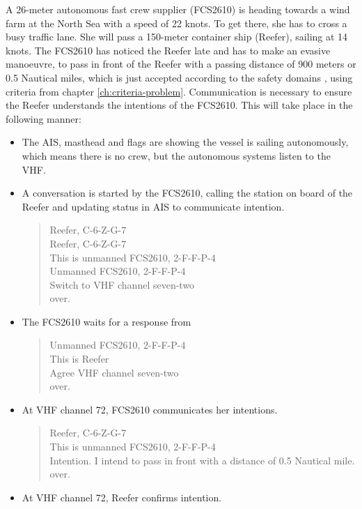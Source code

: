 A 26-meter autonomous fast crew supplier (FCS2610) is heading towards a wind farm at the North Sea with a speed of 22 knots. To get there, she has to cross a busy traffic lane. She will pass a 150-meter container ship (Reefer), sailing at 14 knots. The FCS2610 has noticed the Reefer late and has to make an evasive manoeuvre, to pass in front of the Reefer with a passing distance of 900 meters or 0.5 Nautical miles, which is just accepted according to the safety domains \cite{Szlapczynski2017a}, using criteria from chapter \ref{ch:criteria-problem}.
Communication is necessary to ensure the Reefer understands the intentions of the FCS2610. This will take place in the following manner:
\begin{itemize}
	\item The \ac{AIS}, masthead and flags are showing the vessel is sailing autonomously, which means there is no crew, but the autonomous systems listen to the \ac{VHF}.
	\item A conversation is started by the FCS2610, calling the station on board of the Reefer and updating status in \ac{AIS} to communicate intention. 
	\begin{quote}
		Reefer, C-6-Z-G-7\\
		Reefer, C-6-Z-G-7\\
		This is unmanned FCS2610, 2-F-F-P-4 \\
		Unmanned FCS2610, 2-F-F-P-4 \\
		Switch to VHF channel seven-two\\
		over.
	\end{quote}
	\item The FCS2610 waits for a response from 
	\begin{quote}
		Unmanned FCS2610, 2-F-F-P-4 \\
		This is Reefer\\
		Agree VHF channel seven-two\\
		over.
	\end{quote}
	\item At \ac{VHF} channel 72, FCS2610 communicates her intentions.
	\begin{quote}
		Reefer, C-6-Z-G-7\\
		This is unmanned FCS2610, 2-F-F-P-4 \\
		Intention. I intend to pass in front with a distance of 0.5 Nautical mile.\\
		over.
	\end{quote}
\newpage
	\item At \ac{VHF} channel 72, Reefer confirms intention.

\end{itemize}

